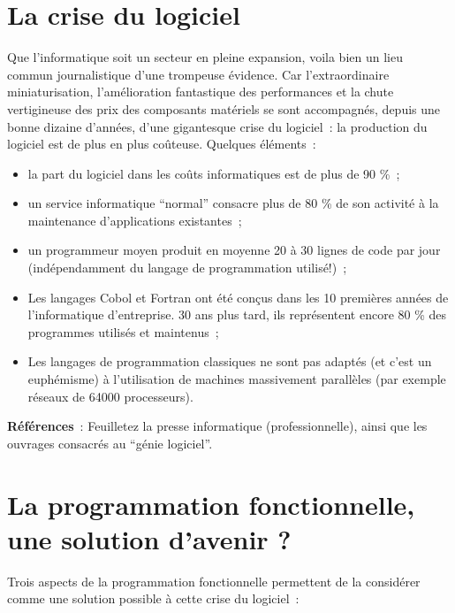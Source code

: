 \section{La crise du logiciel}

Que l'informatique soit un secteur en pleine expansion, voila bien un
lieu commun journalistique d'une trompeuse évidence. Car
l'extraordinaire miniaturisation, l'amélioration fantastique des
performances et la chute vertigineuse des prix des composants
matériels se sont accompagnés, depuis une bonne dizaine d'années,
d'une gigantesque crise du logiciel~: la production du logiciel est de
plus en plus coûteuse. Quelques éléments~:

\begin{itemize}
\item la part du logiciel dans les coûts informatiques est de plus de 90 \%~;
\item un service informatique ``normal'' consacre 
plus de 80 \% de son activité à la maintenance d'applications
existantes~;
\item un programmeur moyen produit en moyenne 20 à 30 lignes
 de code par jour (indépendamment du langage de programmation
 utilisé!)~;
\item Les langages Cobol et Fortran ont été conçus dans 
les 10 premières années de l'informatique d'entreprise. 30 ans plus
tard, ils représentent encore 80 \% des programmes utilisés et
maintenus~;
\item Les langages de programmation 
classiques ne sont pas adaptés (et c'est un euphémisme) à
l'utilisation de machines massivement parallèles (par exemple réseaux
de 64000 processeurs).
\end{itemize}

{\bf Références}~: Feuilletez la presse informatique
(professionnelle), ainsi que les ouvrages consacrés au ``génie
logiciel''.


\section{La programmation fonctionnelle, une solution d'avenir ?}

Trois aspects de la programmation fonctionnelle permettent de la 
considérer comme une solution possible à cette crise du logiciel~:

